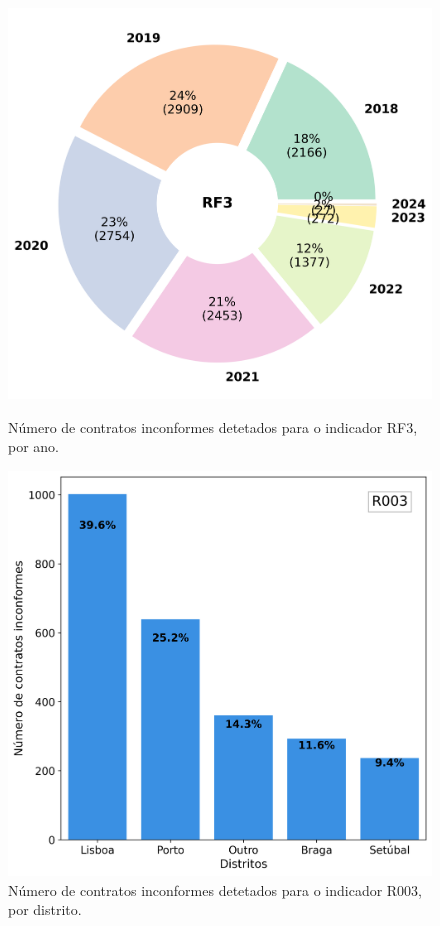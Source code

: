\begin{figure}[H]
	\centering
	\begin{minipage}{.48\linewidth}
		\includegraphics[width=\linewidth]{imagens/final/circle_RF3.png}
		\caption{Número de contratos inconformes detetados para o indicador RF3, por ano.}
		\label{final6}
		
	\end{minipage}
	\hfill
	\begin{minipage}{.48\linewidth}
		\includegraphics[width=\linewidth]{imagens/final/bar_R003.png}
		\caption{Número de contratos inconformes detetados para o indicador R003, por distrito.}
		\label{final7}
		
	\end{minipage}
\end{figure}


